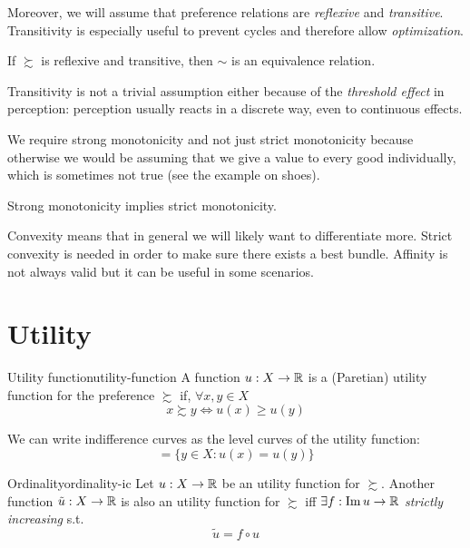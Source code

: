 \documentclass[12pt]{extarticle}
\begin{document}
Moreover, we will assume that preference relations are \emph{reflexive} and \emph{transitive}.
Transitivity is especially useful to prevent cycles and therefore allow \emph{optimization}.

\begin{corollary}{}{}
    If $\succsim$ is reflexive and transitive, then $\sim$ is an equivalence relation.
\end{corollary}

Transitivity is not a trivial assumption either because of the \emph{threshold effect} in perception:
perception usually reacts in a discrete way, even to continuous effects.

We require strong monotonicity and not just strict monotonicity because otherwise we would be assuming that we give a value to every good individually, which is sometimes not true (see the example on shoes).

\begin{corollary}{}{}
    Strong monotonicity implies strict monotonicity.
\end{corollary}

Convexity means that in general we will likely want to differentiate more.
Strict convexity is needed in order to make sure there exists a best bundle.
Affinity is not always valid but it can be useful in some scenarios.

\section{Utility}

\begin{definition}{Utility function}{utility-function}
    A function $u: X \to \mathbb{R}$ is a (Paretian) utility function for the preference $\succsim$ if, $\forall x, y \in X$
    \begin{equation}
        x \succsim y \iff u(x) \geq u(y)
    \end{equation}
\end{definition}

We can write indifference curves as the level curves of the utility function:
\begin{equation}
    [x] = \{ y \in X : u(x) = u(y) \}
\end{equation}

\begin{proposition}{Ordinality}{ordinality-ic}
    Let $u: X \to \mathbb{R}$ be an utility function for $\succsim$.
    Another function $\tilde{u}: X \to \mathbb{R}$ is also an utility function for $\succsim$ iff
    $\exists f: \Im u \to \mathbb{R}$ \emph{strictly increasing} s.t.
    \begin{equation}
        \tilde{u} = f \circ u
    \end{equation}
\end{proposition}
\end{document}
